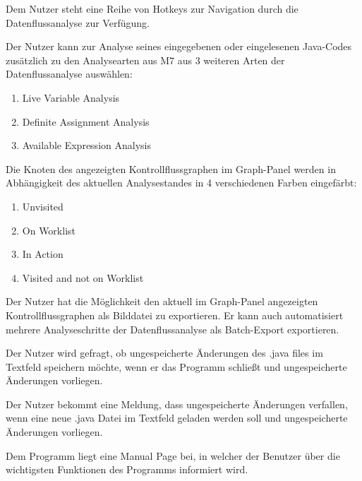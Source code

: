 Dem Nutzer steht eine Reihe von Hotkeys zur Navigation durch die
Datenflussanalyse zur Verfügung.

Der Nutzer kann zur Analyse seines eingegebenen oder eingelesenen Java-Codes
zusätzlich zu den Analysearten aus M7 aus 3 weiteren Arten der Datenflussanalyse
auswählen:
\begin{enumerate}[label=(\alph*)]
\item  Live Variable Analysis
\item Definite Assignment Analysis
\item Available Expression Analysis
\end{enumerate}

Die Knoten des angezeigten Kontrollflussgraphen im Graph-Panel werden in
Abhängigkeit des aktuellen Analysestandes in 4 verschiedenen Farben eingefärbt:
\begin{enumerate}[label=(\alph*)]
\item Unvisited
\item On Worklist
\item In Action
\item Visited and not on Worklist
\end{enumerate}

Der Nutzer hat die Möglichkeit den aktuell im Graph-Panel angezeigten Kontrollflussgraphen als Bilddatei zu exportieren. Er kann auch automatisiert mehrere Analyseschritte der Datenflussanalyse als Batch-Export exportieren.

Der Nutzer wird gefragt, ob ungespeicherte Änderungen des .java files im Textfeld
speichern möchte, wenn er das Programm schließt und ungespeicherte Änderungen vorliegen.

Der Nutzer bekommt eine Meldung, dass ungespeicherte Änderungen verfallen,
wenn eine neue .java Datei im Textfeld geladen werden soll und ungespeicherte
Änderungen vorliegen.

Dem Programm liegt eine Manual Page bei, in welcher der Benutzer über die wichtigsten Funktionen des Programms informiert wird.